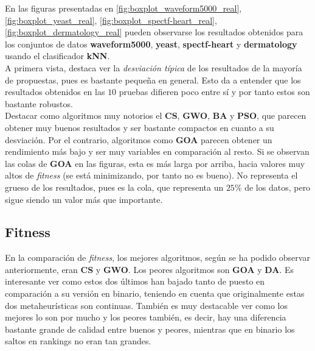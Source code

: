 En las figuras presentadas en \ref{fig:boxplot_waveform5000_real}, \ref{fig:boxplot_yeast_real}, \ref{fig:boxplot_spectf-heart_real}, \ref{fig:boxplot_dermatology_real} pueden observarse los resultados obtenidos para los conjuntos de datos \textbf{waveform5000}, \textbf{yeast}, \textbf{spectf-heart} y \textbf{dermatology} usando el clasificador \textbf{kNN}.\\[6pt]

A primera vista, destaca ver la \textit{desviación típica} de los resultados de la mayoría de propuestas, pues es bastante pequeña en general. Esto da a entender que los resultados obtenidos en las $10$ pruebas difieren poco entre sí y por tanto estos son bastante robustos. \\[6pt]
Destacar como algoritmos muy notorios el \textbf{CS}, \textbf{GWO}, \textbf{BA} y \textbf{PSO}, que parecen obtener muy buenos resultados y ser bastante compactos en cuanto a su desviación. Por el contrario, algoritmos como \textbf{GOA} parecen obtener un rendimiento más bajo y ser muy variables en comparación al resto. Si se observan las colas de \textbf{GOA} en las figuras, esta es más larga por arriba, hacia valores muy altos de \textit{fitness} (se está minimizando, por tanto no es bueno). No representa el grueso de los resultados, pues es la cola, que representa un $25\%$ de los datos, pero sigue siendo un valor más que importante.\\[6pt]

\subsection{Fitness}
En la comparación de \textit{fitness}, los mejores algoritmos, según se ha podido observar anteriormente, eran \textbf{CS} y \textbf{GWO}. Los peores algoritmos son \textbf{GOA} y \textbf{DA}. Es interesante ver como estos dos últimos han bajado tanto de puesto en comparación a su versión en binario, teniendo en cuenta que originalmente estas dos metaheurísticas son continuas. También es muy destacable ver como los mejores lo son por mucho y los peores también, es decir, hay una diferencia bastante grande de calidad entre buenos y peores, mientras que en binario los saltos en rankings no eran tan grandes.

